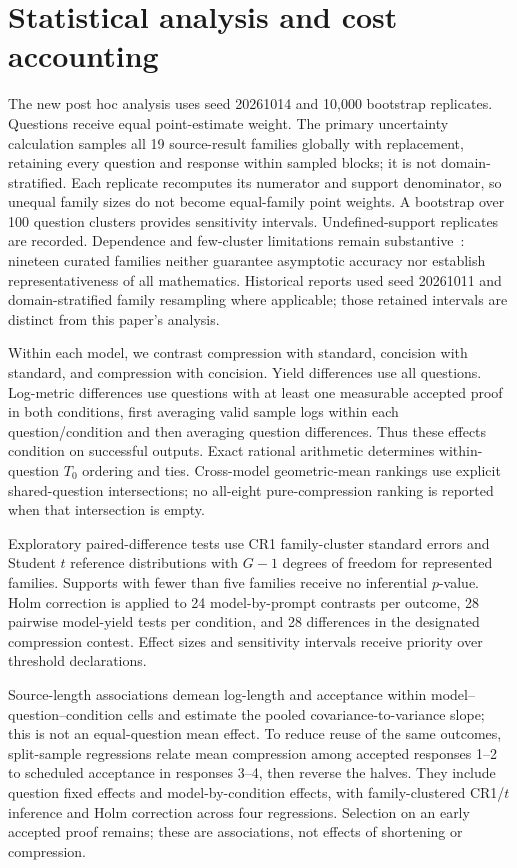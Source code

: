 \section{Statistical analysis and cost accounting}
\label{sec:methods-statistics}

The new post hoc analysis uses seed 20261014 and 10,000 bootstrap replicates. Questions receive equal point-estimate weight. The primary uncertainty calculation samples all 19 source-result families globally with replacement, retaining every question and response within sampled blocks; it is not domain-stratified. Each replicate recomputes its numerator and support denominator, so unequal family sizes do not become equal-family point weights. A bootstrap over 100 question clusters provides sensitivity intervals. Undefined-support replicates are recorded. Dependence and few-cluster limitations remain substantive~\cite{cluster}: nineteen curated families neither guarantee asymptotic accuracy nor establish representativeness of all mathematics. Historical reports used seed 20261011 and domain-stratified family resampling where applicable; those retained intervals are distinct from this paper's analysis.

Within each model, we contrast compression with standard, concision with standard, and compression with concision. Yield differences use all questions. Log-metric differences use questions with at least one measurable accepted proof in both conditions, first averaging valid sample logs within each question/condition and then averaging question differences. Thus these effects condition on successful outputs. Exact rational arithmetic determines within-question $T_0$ ordering and ties. Cross-model geometric-mean rankings use explicit shared-question intersections; no all-eight pure-compression ranking is reported when that intersection is empty.

Exploratory paired-difference tests use CR1 family-cluster standard errors and Student $t$ reference distributions with $G-1$ degrees of freedom for represented families. Supports with fewer than five families receive no inferential $p$-value. Holm correction is applied to 24 model-by-prompt contrasts per outcome, 28 pairwise model-yield tests per condition, and 28 differences in the designated compression contest. Effect sizes and sensitivity intervals receive priority over threshold declarations.

Source-length associations demean log-length and acceptance within model--question--condition cells and estimate the pooled covariance-to-variance slope; this is not an equal-question mean effect. To reduce reuse of the same outcomes, split-sample regressions relate mean compression among accepted responses 1--2 to scheduled acceptance in responses 3--4, then reverse the halves. They include question fixed effects and model-by-condition effects, with family-clustered CR1/$t$ inference and Holm correction across four regressions. Selection on an early accepted proof remains; these are associations, not effects of shortening or compression.

